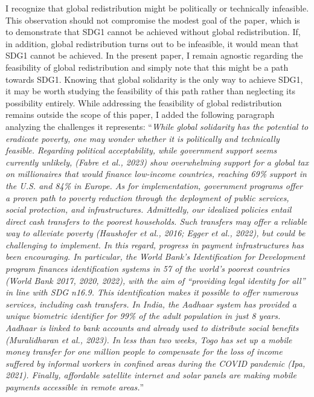 \documentclass[12pt,english]{article}
\begin{document}
I recognize that global redistribution might be politically or technically infeasible. This observation should not compromise the modest goal of the paper, which is to demonstrate that SDG1 cannot be achieved without global redistribution. If, in addition, global redistribution turns out to be infeasible, it would mean that SDG1 cannot be achieved. In the present paper, I remain agnostic regarding the feasibility of global redistribution and simply note that this might be a path towards SDG1. Knowing that global solidarity is the only way to achieve SDG1, it may be worth studying the feasibility of this path rather than neglecting its possibility entirely. 
While addressing the feasibility of global redistribution remains outside the scope of this paper, I added the following paragraph analyzing the challenges it represents: 
``\textit{While global solidarity has the potential to eradicate poverty, one may wonder whether it is politically and technically feasible. 
Regarding political acceptability, while government support seems currently unlikely, (Fabre et al., 2023) show overwhelming support for a global tax on millionaires that would finance low-income countries, reaching 69\% support in the U.S. and 84\% in Europe. %
As for implementation, government programs offer a proven path to poverty reduction through the deployment of public services, social protection, and infrastructures. 
Admittedly, our idealized policies entail direct cash transfers to the poorest households. Such transfers may offer a reliable way to alleviate poverty (Haushofer et al., 2016; Egger et al., 2022), but could be challenging to implement. In this regard, progress in payment infrastructures has been encouraging. In particular, the World Bank's \textit{Identification for Development} program finances identification systems in 57 of the world's poorest countries (World Bank 2017, 2020, 2022), with the aim of ``providing legal identity for all'' in line with SDG n\textdegree{}16.9. This identification makes it possible to offer numerous services, including cash transfers. In India, the Aadhaar system has provided a unique biometric identifier for 99\% of the adult population in just 8 years. Aadhaar is linked to bank accounts and already used to distribute social benefits (Muralidharan et al., 2023). In less than two weeks, Togo has set up a mobile money transfer for one million people to compensate for the loss of income suffered by informal workers in confined areas during the COVID pandemic (Ipa, 2021). Finally, affordable satellite internet and solar panels are making mobile payments accessible in remote areas.}''
~\\ ~\\
\end{document}
